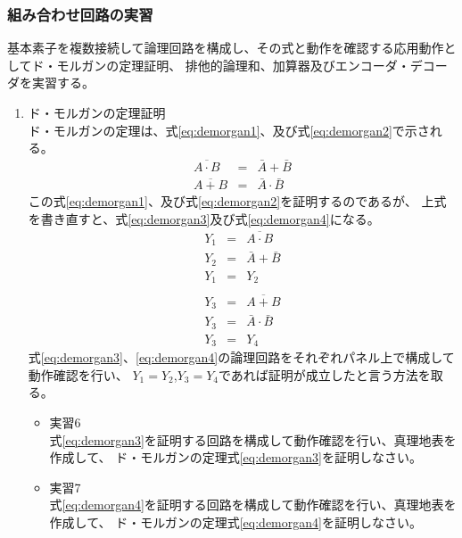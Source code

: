 \documentclass[dvipdfmx]{jsarticle}
\begin{document}
				\subsubsection{組み合わせ回路の実習}
					基本素子を複数接続して論理回路を構成し、その式と動作を確認する応用動作としてド・モルガンの定理証明、
					排他的論理和、加算器及びエンコーダ・デコーダを実習する。
					\begin{enumerate}
						\item ド・モルガンの定理証明 \\
							ド・モルガンの定理は、式\ref{eq:demorgan1}、及び式\ref{eq:demorgan2}で示される。
							\begin{eqnarray}
								\label{eq:demorgan1}
								\overline{A \cdot B} &=& \bar{A} + \bar{B} \\
								\label{eq:demorgan2}
								\overline{A + B} &=& \bar{A} \cdot \bar{B}
							\end{eqnarray}
							この式\ref{eq:demorgan1}、及び式\ref{eq:demorgan2}を証明するのであるが、
							上式を書き直すと、式\ref{eq:demorgan3}及び式\ref{eq:demorgan4}になる。
							\begin{eqnarray}
								\label{eq:demorgan3}
								Y_1 &=& \overline{A \cdot B} \\
								Y_2 &=& \bar{A} + \bar{B} \\
								Y_1 &=& Y_2 \\
							\end{eqnarray}
							\begin{eqnarray}
								\label{eq:demorgan4}
								Y_3 &=& \overline{A + B} \\
								Y_3 &=& \bar{A} \cdot \bar{B} \\
								Y_3 &=& Y_4
							\end{eqnarray}
							式\ref{eq:demorgan3}、\ref{eq:demorgan4}の論理回路をそれぞれパネル上で構成して動作確認を行い、
							$Y_1=Y_2$,$Y_3=Y_4$であれば証明が成立したと言う方法を取る。
							\begin{itemize}
								\item 実習6 \\
									式\ref{eq:demorgan3}を証明する回路を構成して動作確認を行い、真理地表を作成して、
									ド・モルガンの定理式\ref{eq:demorgan3}を証明しなさい。
								\item 実習7 \\
									式\ref{eq:demorgan4}を証明する回路を構成して動作確認を行い、真理地表を作成して、
									ド・モルガンの定理式\ref{eq:demorgan4}を証明しなさい。
							\end{itemize}

\end{enumerate}
\end{document}
